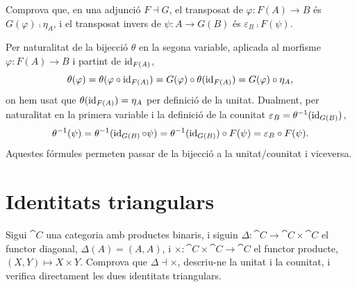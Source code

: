 \begin{exercici}
Comprova que, en una adjunció $F\dashv G$, el transposat de $\varphi\colon F(A)\to B$ és $G(\varphi)\comp\eta_A$, i el transposat invers de $\psi\colon A\to G(B)$ és $\varepsilon_B\comp F(\psi)$.
\end{exercici}

\begin{solucio}
Per naturalitat de la bijecció $\theta$ en la segona variable, aplicada al morfisme $\varphi\colon F(A)\to B$ i partint de $\operatorname{id}_{F(A)}$,
\[
\theta(\varphi)=\theta(\varphi\circ\operatorname{id}_{F(A)})=G(\varphi)\circ\theta(\operatorname{id}_{F(A)})=G(\varphi)\circ\eta_A,
\]
on hem usat que $\theta(\operatorname{id}_{F(A)})=\eta_A$ per definició de la unitat. Dualment, per naturalitat en la primera variable i la definició de la counitat $\varepsilon_B=\theta^{-1}(\operatorname{id}_{G(B)})$,
\[
\theta^{-1}(\psi)=\theta^{-1}(\operatorname{id}_{G(B)}\circ\psi)=\theta^{-1}(\operatorname{id}_{G(B)})\circ F(\psi)=\varepsilon_B\circ F(\psi).
\]
Aquestes fórmules permeten passar de la bijecció a la unitat/counitat i viceversa.
\end{solucio}

\section{Identitats triangulars}

\begin{exercici}\label{pr-diagonal-producte}
Sigui $\cat{C}$ una categoria amb productes binaris, i siguin $\Delta\colon\cat{C}\to\cat{C}\times\cat{C}$ el functor diagonal, $\Delta(A)=(A,A)$, i $\times\colon\cat{C}\times\cat{C}\to\cat{C}$ el functor producte, $(X,Y)\mapsto X\times Y$. Comprova que $\Delta\dashv\times$, descriu-ne la unitat i la counitat, i verifica directament les dues identitats triangulars.
\end{exercici}

